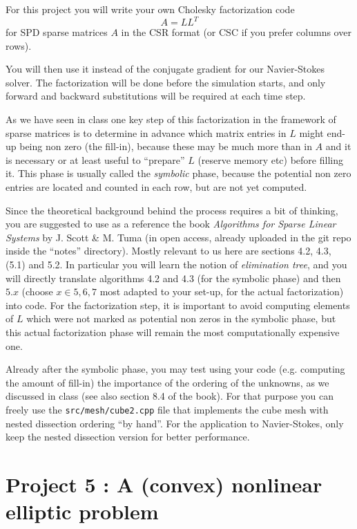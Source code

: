 \documentclass[11pt]{article}
\begin{document}
For this project you will write your own Cholesky factorization code  
$$
A = LL^T
$$
for SPD sparse matrices $A$ in the CSR format (or CSC if you prefer columns 
over rows).

You will then use it instead of the conjugate gradient for our Navier-Stokes
solver. The factorization will be done before the simulation starts, and
only forward and backward substitutions will be required at each time step. 
 
As we have seen in class one key step of this factorization in the framework 
of sparse matrices is to
determine in advance which 
matrix entries in $L$ might end-up being non zero (the fill-in), because these may be
much more than in $A$ and it is necessary or at least useful to ``prepare'' $L$ (reserve memory
etc) before filling it. This phase is usually called the {\it symbolic} phase, because 
the potential non zero entries are located and counted in each row, but are not
yet computed.

Since the theoretical background behind the process requires a bit of thinking, 
you are suggested to use as a reference the book {\it Algorithms for Sparse 
Linear Systems} by J. Scott \& M. Tuma (in open access, already uploaded in the
git repo inside the ``notes'' directory). Mostly relevant to us here are sections 
4.2, 4.3, (5.1) and 5.2. 
In particular you will learn the notion of {\it elimination tree}, and you 
will directly translate algorithms 4.2 and 4.3 (for the symbolic phase) and 
then $5.x$ (choose $x \in {5, 6, 7}$ most adapted to your set-up,  
for the actual factorization) into code. For the factorization step,
it is important to avoid computing elements of $L$ which were not marked as
potential non zeros in the symbolic phase, but this actual factorization phase 
will remain the most computationally expensive one.


Already after the symbolic phase, you may test using your code (e.g. computing the amount of
fill-in) the importance of the ordering of the unknowns, as we discussed in
class (see also section 8.4 of the book). For that purpose you can freely use 
the {\tt src/mesh/cube2.cpp} file that implements the cube mesh with nested 
dissection ordering ``by hand''.  For the application to Navier-Stokes, only
keep the nested dissection version for better performance.

\pagebreak
\section*{Project 5 : A (convex) nonlinear elliptic problem}
\end{document}
